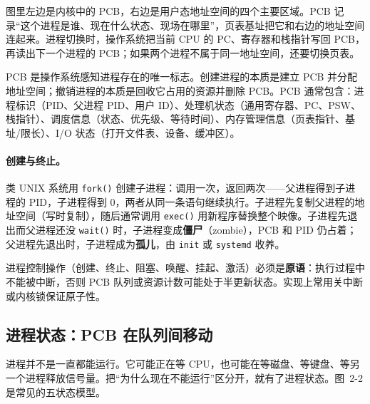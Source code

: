 图里左边是内核中的 PCB，右边是用户态地址空间的四个主要区域。PCB 记录“这个进程是谁、现在什么状态、现场在哪里”，页表基址把它和右边的地址空间连起来。进程切换时，操作系统把当前 CPU 的 PC、寄存器和栈指针写回 PCB，再读出下一个进程的 PCB；如果两个进程不属于同一地址空间，还要切换页表。

PCB 是操作系统感知进程存在的唯一标志。创建进程的本质是建立 PCB 并分配地址空间；撤销进程的本质是回收它占用的资源并删除 PCB。PCB 通常包含：进程标识（PID、父进程 PID、用户 ID）、处理机状态（通用寄存器、PC、PSW、栈指针）、调度信息（状态、优先级、等待时间）、内存管理信息（页表指针、基址/限长）、I/O 状态（打开文件表、设备、缓冲区）。

\paragraph{创建与终止。} 类 UNIX 系统用 \texttt{fork()} 创建子进程：调用一次，返回两次——父进程得到子进程的 PID，子进程得到 0，两者从同一条语句继续执行。子进程先复制父进程的地址空间（写时复制），随后通常调用 \texttt{exec()} 用新程序替换整个映像。子进程先退出而父进程还没 \texttt{wait()} 时，子进程变成\textbf{僵尸}（zombie），PCB 和 PID 仍占着；父进程先退出时，子进程成为\textbf{孤儿}，由 \texttt{init} 或 \texttt{systemd} 收养。

进程控制操作（创建、终止、阻塞、唤醒、挂起、激活）必须是\textbf{原语}：执行过程中不能被中断，否则 PCB 队列或资源计数可能处于半更新状态。实现上常用关中断或内核锁保证原子性。

\subsection{进程状态：PCB 在队列间移动}

进程并不是一直都能运行。它可能正在等 CPU，也可能在等磁盘、等键盘、等另一个进程释放信号量。把“为什么现在不能运行”区分开，就有了进程状态。图~2-2 是常见的五状态模型。

